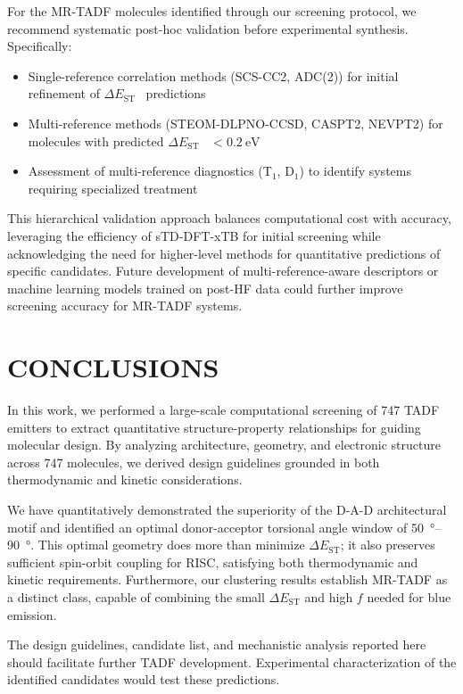 \documentclass[journal=jcisd8,manuscript=article,keywords=true]{achemso}
\newcommand{\deltaest}{$\Delta E_{\text{ST}}$}
\begin{document}
For the MR-TADF molecules identified through our screening protocol, we recommend systematic post-hoc validation before experimental synthesis. Specifically:
\begin{itemize}
    \item Single-reference correlation methods (SCS-CC2, ADC(2)) for initial refinement of \deltaest~ predictions
    \item Multi-reference methods (STEOM-DLPNO-CCSD, CASPT2, NEVPT2) for molecules with predicted \deltaest~ $< \qty{0.2}{\electronvolt}$
    \item Assessment of multi-reference diagnostics (T$_1$, D$_1$) to identify systems requiring specialized treatment
\end{itemize}

This hierarchical validation approach balances computational cost with accuracy, leveraging the efficiency of sTD-DFT-xTB for initial screening while acknowledging the need for higher-level methods for quantitative predictions of specific candidates. Future development of multi-reference-aware descriptors or machine learning models trained on post-HF data could further improve screening accuracy for MR-TADF systems.


\section{CONCLUSIONS}\label{sec:conclusions}

In this work, we performed a large-scale computational screening of \num{747} TADF emitters to extract quantitative structure-property relationships for guiding molecular design. By analyzing architecture, geometry, and electronic structure across 747 molecules, we derived design guidelines grounded in both thermodynamic and kinetic considerations.

We have quantitatively
demonstrated the superiority of the D-A-D architectural motif and identified an optimal
donor-acceptor torsional angle window of \qtyrange{50}{90}{\degree}. This optimal geometry does more than minimize \deltaest; it also preserves sufficient spin-orbit coupling for RISC, satisfying both thermodynamic and kinetic requirements. Furthermore, our clustering results establish MR-TADF as a distinct class, capable of combining the small \deltaest{} and high $f$ needed for blue emission.

The design guidelines, candidate list, and mechanistic analysis reported here should facilitate further TADF development. Experimental characterization of the identified candidates would test these predictions.
\end{document}
